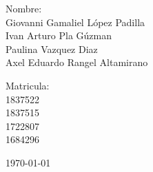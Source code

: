 \begin{titlepage}
    \begin{center}
    \begin{minipage}{0.6\linewidth}
    \vspace{0.5cm}
    \changefontsizes{14pt}
    Nombre:\\
    Giovanni Gamaliel López Padilla\\
    Ivan Arturo Pla Gúzman\\
    Paulina Vazquez Diaz\\
    Axel Eduardo Rangel Altamirano\\
    \end{minipage}
    \begin{minipage}{0.2\linewidth}
    \changefontsizes{14pt}
    Matricula:\\
    1837522\\
    1837515\\
    1722807\\
    1684296
    \end{minipage}
    \end{center}
    \vspace{4cm}
    \begin{flushright}
    \today
    \end{flushright}
    \end{titlepage}